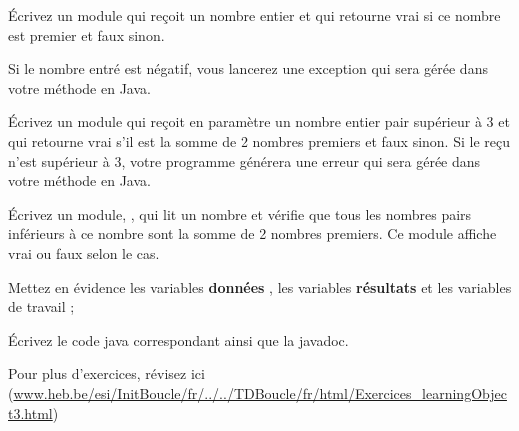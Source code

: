 \documentclass[11pt,a4paper]{article}
\begin{document}
          \'Ecrivez un module \verb@isPremier@ qui re\c coit un nombre entier \verb@n@ 
          et qui retourne vrai si ce nombre est premier et faux sinon.
        
            \par
        Si le nombre entr\'e est n\'egatif, vous lancerez une exception qui sera g\'er\'ee dans votre m\'ethode 
        \verb@main@ en Java.
            \par
        
          \'Ecrivez un module \verb@goldbach@ qui re\c coit en param\`etre 
          un nombre entier pair \verb@p@ sup\'erieur \`a 3 
          et qui retourne vrai s'il est la somme de 2 nombres premiers et faux sinon.
          Si le \verb@p@ re\c cu n'est sup\'erieur \`a 3, votre programme g\'en\'erera une erreur qui sera g\'er\'ee dans votre m\'ethode 
        \verb@main@ en Java.
            \par
        
          \'Ecrivez un module, \verb@principal@, qui lit un nombre et v\'erifie que tous les
          nombres pairs inf\'erieurs \`a ce nombre sont la somme de 2 nombres premiers. Ce module affiche vrai ou faux selon le cas.
        
            \par
        
          Mettez en \'evidence les variables \textbf{\guillemotleft  donn\'ees \guillemotright }, 
          les variables \textbf{\guillemotleft  r\'esultats \guillemotright } et les variables de travail ;
        
            \par
        \'Ecrivez le code java correspondant ainsi que la javadoc.
            \par
        Pour plus d'exercices, 
        r\'evisez ici (\url{www.heb.be/esi/InitBoucle/fr/../../TDBoucle/fr/html/Exercices\_learningObject3.html})
            \par
        
				
\end{document}
